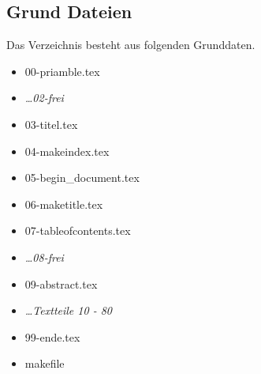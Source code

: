 \subsection{Grund Dateien}
\label{ssec:grund-dateien}

\todo

Das Verzeichnis besteht aus folgenden Grunddaten.

\begin{itemize}
	\item 00-priamble.tex
	\item \emph{\dots 02-frei}
	\item 03-titel.tex
	\item 04-makeindex.tex
	\item 05-begin\_document.tex
	\item 06-maketitle.tex
	\item 07-tableofcontents.tex
	\item \emph{\dots 08-frei}
	\item 09-abstract.tex
	\item \emph{\dots Textteile 10 - 80}
	\item 99-ende.tex
	\item makefile
\end{itemize}





